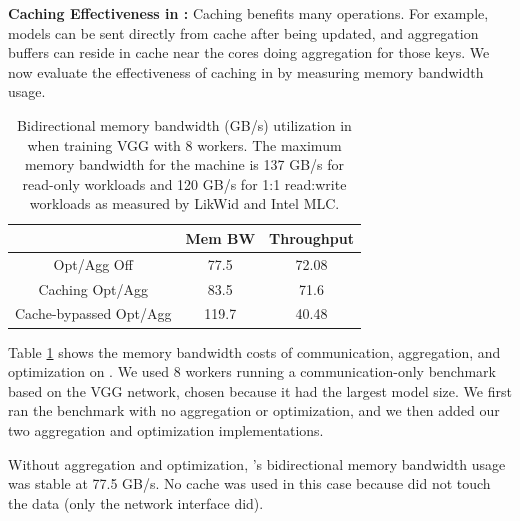 
\vspace{0.05in}
\noindent \textbf{Caching Effectiveness in \phub:}
\label{eval:cache}
Caching benefits many \phub operations. For example, models can be sent directly from cache after being updated, and aggregation buffers can reside in cache near the cores doing aggregation for those keys. We now evaluate the effectiveness of caching in \phub by measuring memory bandwidth usage.

\begin{table}[t!]
	\centering
	\begin{tabular}{|c|c|c|}
		\hline 
		& Mem BW & Throughput\\
		\hline
		Opt/Agg Off & 77.5 & 72.08 \\
		\hline 
		Caching Opt/Agg & 83.5 & 71.6 \\
		\hline
		Cache-bypassed Opt/Agg & 119.7 & 40.48 \\
		\hline
	\end{tabular}
	\caption{Bidirectional memory bandwidth (GB/s) utilization in \phub when training VGG with 8 workers. The maximum memory bandwidth for the machine is 137 GB/s for read-only workloads and 120 GB/s for 1:1 read:write workloads as measured by LikWid and Intel MLC.}
	\label{table:cacheUtilizationAndAggregationOverhead}
\end{table}

Table \ref{table:cacheUtilizationAndAggregationOverhead} shows the memory bandwidth costs of communication, aggregation, and optimization on \pbox. We used 8 workers running a communication-only benchmark based on the VGG network, chosen because it had the largest model size. We first ran the benchmark with no aggregation or optimization, and we then added our two aggregation and optimization implementations.

Without aggregation and optimization, \pbox{}'s bidirectional memory bandwidth usage was stable at 77.5 GB/s. No cache was used in this case because \pbox did not touch the data (only the network interface did).

